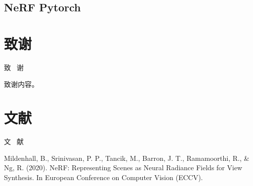 \documentclass{nwputhesis}
\begin{document}
\subsection{NeRF Pytorch}
\makespace
\section*{致谢}
\begin{center}
    { \blackti \fontsize{16.0600pt}{1.25}致 \, 谢}
\end{center}
致谢内容。

\makespace
\section*{文献}
\begin{center}
    { \blackti \fontsize{16.0600pt}{1.25}文 \, 献}
\end{center}
\noindent
Mildenhall, B., Srinivasan, P. P., Tancik, M., Barron, J. T., Ramamoorthi, R., \& Ng, R. (2020). NeRF: 
Representing Scenes as Neural Radiance Fields for View Synthesis. In European Conference on Computer Vision 
(ECCV).\\
\end{document}
